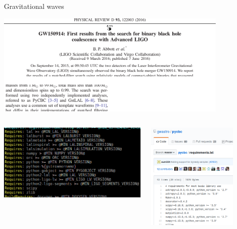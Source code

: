 \documentclass[svgnames]{beamer}
\begin{document}
\begin{frame}{Gravitational waves}

 \vspace{0.5truecm}
 \includegraphics[width=0.85\textwidth]{abbott2016}

 \vspace{-1.2truecm}
 \begin{columns}
  \begin{column}{0.5\textwidth}
   \includegraphics[width=\textwidth]{gstlal_spec_in}
  \end{column}%
  \begin{column}{0.5\textwidth}
   \includegraphics[width=0.8\textwidth]{pycbc_requirements}
	
   \vspace{1truecm}
  \end{column}
 \end{columns}
\end{frame}
\end{document}
